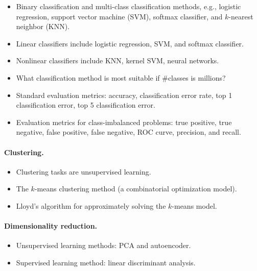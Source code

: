\documentclass[11pt]{article}
\numberwithin{equation}{section}
\begin{document}
\begin{itemize}
	\item
	Binary classification and multi-class classification methods, e.g., logistic regression, support vector machine (SVM), softmax classifier, and $k$-nearest neighbor (KNN).
	\item
	Linear classifiers include logistic regression, SVM, and softmax classifier.
	\item
	Nonlinear classifiers include KNN, kernel SVM, neural networks.
	\item
	What classification method is most suitable if \#classes is millions?
	\item
	Standard evaluation metrics: accuracy, classification error rate, top 1 classification error, top 5 classification error.
	\item
	Evaluation metrics for class-imbalanced problems: true positive, true negative, false positive, false negative, ROC curve, precision, and recall.
\end{itemize}







\paragraph{Clustering.}

\begin{itemize}
	\item
	Clustering tasks are unsupervised learning.
	\item
	The $k$-means clustering method (a combinatorial optimization model).
	\item
	Lloyd's algorithm for approximately solving the $k$-means model.
\end{itemize}





\paragraph{Dimensionality reduction.}

\begin{itemize}
	\item
	Unsupervised learning methods: PCA and autoencoder.
	\item
	Supervised learning method: linear discriminant analysis.
\end{itemize}
\end{document}
